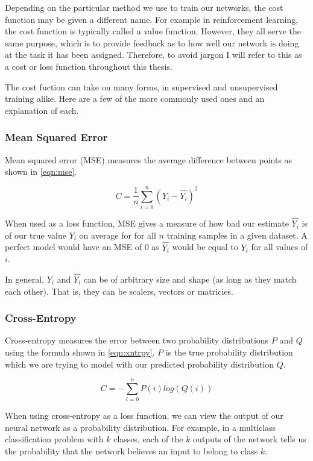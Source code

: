 Depending on the particular method we use to train our networks, the cost function may be given a different name. For example in reinforcement learning, the cost function is typically called a value function. However, they all serve the same purpose, which is to provide feedback as to how well our network is doing at the task it has been assigned. Therefore, to avoid jargon I will refer to this as a cost or loss function throughout this thesis.

The cost fuction can take on many forms, in supervised and unsupervised training alike. Here are a few of the more commonly used ones and an explanation of each.

\subsubsection{Mean Squared Error}
Mean squared error (MSE) measures the average difference between points as shown in \autoref{eqn:mse}.

\begin{equation}
C = \frac{1}{n}\sum_{i=0}^{n} (Y_i - \hat{Y_i})^2
\label{eqn:mse}
\end{equation}

When used as a loss function, MSE gives a measure of how bad our estimate $\hat{Y_i}$ is of our true value $Y_i$ on average for for all $n$ training samples in a given dataset. A perfect model would have an MSE of 0 as $\hat{Y_i}$ would be equal to $Y_i$ for all values of $i$.

In general, $Y_i$ and $\hat{Y_i}$ can be of arbitrary size and shape (as long as they match each other). That is, they can be scalers, vectors or matricies.

\subsubsection{Cross-Entropy}
Cross-entropy measures the error between two probability distributions $P$ and $Q$ using the formula shown in \autoref{eqn:xntrpy}. $P$ is the true probability distribution which we are trying to model with our predicted probability distribution $Q$.

\begin{equation}
C = -\sum_{i=0}^{n}P(i) log(Q(i))
\label{eqn:xntrpy}
\end{equation}

When using cross-entropy as a loss function, we can view the output of our neural network as a probability distribution. For example, in a multiclass classification problem with $k$ classes, each of the $k$ outputs of the network tells us the probability that the network believes an input to belong to class $k$.

